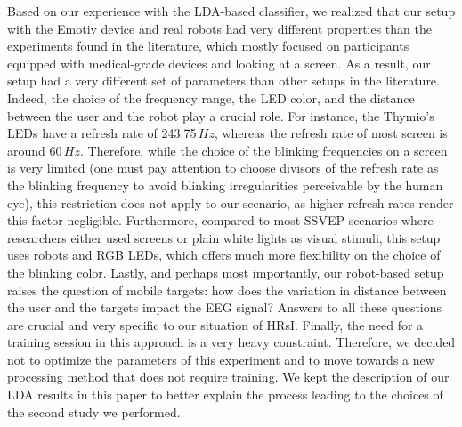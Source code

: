 \documentclass[smallextended]{svjour3}
\begin{document}
Based on our experience with the LDA-based classifier, we realized that our setup with the Emotiv device and real robots had very different properties than the experiments found in the literature, which mostly focused on participants equipped with medical-grade devices and looking at a screen.
As a result, our setup had a very different set of parameters than other setups in the literature. 
Indeed, the choice of the frequency range, the LED color, and the distance between the user and the robot play a crucial role. 
For instance, the Thymio's LEDs have a refresh rate of 243.75\,$Hz$, whereas the refresh rate of most screen is around 60\,$Hz$. 
Therefore, while the choice of the blinking frequencies on a screen is very limited (one must pay attention to choose divisors of the refresh rate as the blinking frequency to avoid blinking irregularities perceivable by the human eye), this restriction does not apply to our scenario, as higher refresh rates render this factor negligible. 
Furthermore, compared to most SSVEP scenarios where researchers either used screens or plain white lights as visual stimuli, this setup uses robots and RGB LEDs, which offers much more flexibility on the choice of the blinking color. Lastly, and perhaps most importantly, our robot-based setup raises the question of mobile targets: how does the variation in distance between the user and the targets impact the EEG signal? 
Answers to all these questions are crucial and very specific to our situation of HRsI.
Finally, the need for a training session in this approach is a very heavy constraint. 
Therefore, we decided not to optimize the parameters of this experiment and to move towards a new processing method that does not require training. We kept the description of our LDA results in this paper to better explain the process leading to the choices of the second study we performed.
\end{document}
